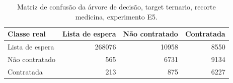 \begin{table}
\caption{Matriz de confusão da árvore de decisão, target ternario, recorte medicina, experimento E5.}
\label{tab:matriz_confusao_treeClassification_ternario_recorte_medicina_in_sample_e5}
\begin{tabular}{lrrr}
\toprule
Classe real & Lista de espera & Não contratado & Contratada \\
\midrule
Lista de espera & 268076 & 10958 & 8550 \\
Não contratado & 565 & 6731 & 9134 \\
Contratada & 213 & 875 & 6227 \\
\bottomrule
\end{tabular}
\end{table}
